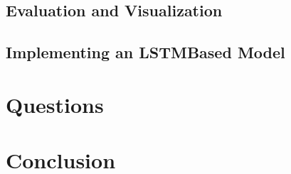 \documentclass[a4paper,12pt]{extarticle}
\begin{document}
\subsection{Evaluation and Visualization}

\subsection{Implementing an LSTMBased Model}

\clearpage

\section{Questions}

\clearpage

\section{Conclusion}
\end{document}
